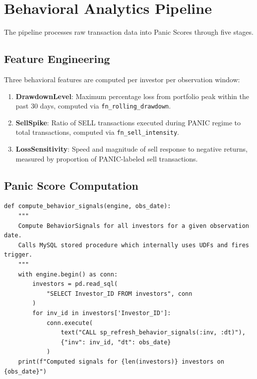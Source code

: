 \section{Behavioral Analytics Pipeline}

The pipeline processes raw transaction data into Panic Scores through five stages.


\subsection{Feature Engineering}

Three behavioral features are computed per investor per observation window:

\begin{enumerate}
    \item \textbf{DrawdownLevel}: Maximum percentage loss from portfolio peak within the past 30 days, computed via \texttt{fn\_rolling\_drawdown}.
    \item \textbf{SellSpike}: Ratio of SELL transactions executed during PANIC regime to total transactions, computed via \texttt{fn\_sell\_intensity}.
    \item \textbf{LossSensitivity}: Speed and magnitude of sell response to negative returns, measured by proportion of PANIC-labeled sell transactions.
\end{enumerate}

\subsection{Panic Score Computation}

\begin{lstlisting}[style=pythonstyle, caption={Panic Score computation script (compute\_behavior\_signals.py)}]
def compute_behavior_signals(engine, obs_date):
    """
    Compute BehaviorSignals for all investors for a given observation date.
    Calls MySQL stored procedure which internally uses UDFs and fires trigger.
    """
    with engine.begin() as conn:
        investors = pd.read_sql(
            "SELECT Investor_ID FROM investors", conn
        )
        for inv_id in investors['Investor_ID']:
            conn.execute(
                text("CALL sp_refresh_behavior_signals(:inv, :dt)"),
                {"inv": inv_id, "dt": obs_date}
            )
    print(f"Computed signals for {len(investors)} investors on {obs_date}")
\end{lstlisting}


